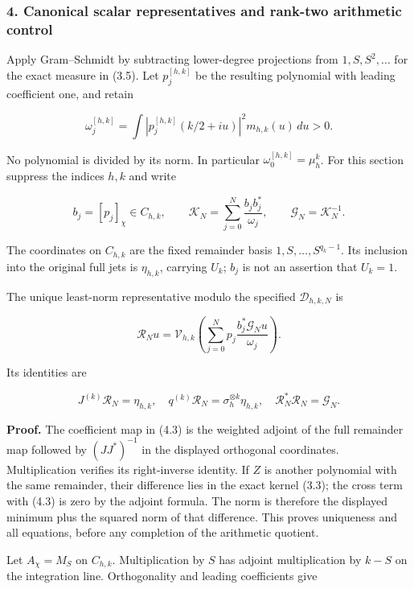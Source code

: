 \subsubsection{4. Canonical scalar representatives and rank-two arithmetic
control}\label{cyclic_sum:canonical-scalar-representatives-and-rank-two-arithmetic-control}

Apply Gram--Schmidt by subtracting lower-degree projections from
\(1,S,S^2,\ldots\) for the exact measure in (3.5). Let \(p_j^{[h,k]}\)
be the resulting polynomial with leading coefficient one, and retain

\[\omega_j^{[h,k]}=\int |p_j^{[h,k]}(k/2+iu)|^2m_{h,k}(u)\,du>0.\tag{4.1}\]

No polynomial is divided by its norm. In particular
\(\omega_0^{[h,k]}=\mu_h^k\). For this section suppress the indices
\(h,k\) and write

\[b_j=[p_j]_\chi\in C_{h,k},\qquad
\mathcal K_N=\sum_{j=0}^N\frac{b_jb_j^*}{\omega_j},\qquad
\mathcal G_N=\mathcal K_N^{-1}.\tag{4.2}\]

The coordinates on \(C_{h,k}\) are the fixed remainder basis
\(1,S,\ldots,S^{q_k-1}\). Its inclusion into the original full jets is
\(\eta_{h,k}\), carrying \(U_k\); \(b_j\) is not an assertion that
\(U_k=1\).

The unique least-norm representative modulo the specified
\(\mathcal D_{h,k,N}\) is

\[\boxed{\mathcal R_Nu=\mathcal V_{h,k}\left(
\sum_{j=0}^Np_j\frac{b_j^*\mathcal G_Nu}{\omega_j}\right).}\tag{4.3}\]

Its identities are

\[J^{(k)}\mathcal R_N=\eta_{h,k},\quad
q^{(k)}\mathcal R_N=\sigma_h^{\otimes k}\eta_{h,k},\quad
\mathcal R_N^*\mathcal R_N=\mathcal G_N.\tag{4.4}\]

\textbf{Proof.} The coefficient map in (4.3) is the weighted adjoint of
the full remainder map followed by \((JJ^*)^{-1}\) in the displayed
orthogonal coordinates. Multiplication verifies its right-inverse
identity. If \(Z\) is another polynomial with the same remainder, their
difference lies in the exact kernel (3.3); the cross term with (4.3) is
zero by the adjoint formula. The norm is therefore the displayed minimum
plus the squared norm of that difference. This proves uniqueness and all
equations, before any completion of the arithmetic quotient.

Let \(A_\chi=M_S\) on \(C_{h,k}\). Multiplication by \(S\) has adjoint
multiplication by \(k-S\) on the integration line. Orthogonality and
leading coefficients give

